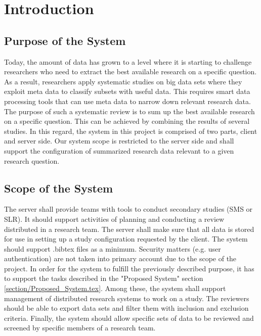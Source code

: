 
\section{Introduction}

\subsection{Purpose of the System}
Today, the amount of data has grown to a level where it is starting to challenge researchers who need to extract the best available research on a specific question. As a result, researchers apply systematic studies on big data sets where they exploit meta data to classify subsets with useful data. This requires smart data processing tools that can use meta data to narrow down relevant research data. The purpose of such a systematic review is to sum up the best available research on a specific question. This can be achieved by combining the results of several studies. In this regard, the system in this project is comprised of two parts, client and server side. Our system scope is restricted to the server side and shall support the configuration of summarized research data relevant to a given research question. 

\subsection{Scope of the System}
The server shall provide teams with tools to conduct secondary studies (SMS or SLR). It should support activities of planning and conducting a review distributed in a research team. The server shall make sure that all data is stored for use in setting up a study configuration requested by the client. The system should support .bibtex files as a minimum. Security matters (e.g. user authentication) are not taken into primary account due to the scope of the project. 
In order for the system to fulfill the previously described purpose, it has to support the tasks described in the "Proposed System" section \ref{section/Proposed_System.tex}. Among these, the system shall support management of distributed research systems to work on a study. The reviewers should be able to export data sets and filter them with inclusion and exclusion criteria. Finally, the system should allow specific sets of data to be reviewed and screened by specific members of a research team. 

